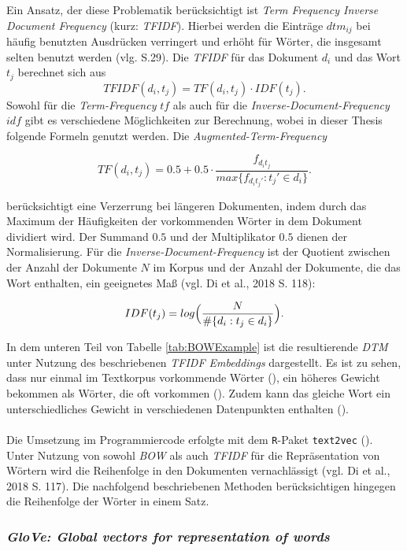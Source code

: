 \documentclass[a4paper,11pt]{article}
\begin{document}
Ein Ansatz, der diese Problematik berücksichtigt ist \textit{Term Frequency Inverse Document Frequency} (kurz: \textit{TFIDF}). Hierbei werden die Einträge $dtm_{ij}$ bei häufig benutzten Ausdrücken verringert und erhöht für Wörter, die insgesamt selten benutzt werden (vlg. \cite{textMiningR} S.29). Die \textit{TFIDF} für das Dokument $d_i$ und das Wort $t_j$ berechnet sich aus 
\[TFIDF(d_i, t_j) = TF(d_i,t_j) \cdot IDF(t_j) . \]
Sowohl für die \textit{Term-Frequency} $tf$ als auch für die \textit{Inverse-Document-Frequency} $idf$ gibt es verschiedene Möglichkeiten zur Berechnung, wobei in dieser Thesis folgende Formeln genutzt werden.
Die \textit{Augmented-Term-Frequency}

\[TF(d_i,t_j) = 0.5 +  0.5 \cdot \frac{f_{d_i t_j}}{max \{ f_{d_i t_j'}: t_j' \in d_i \}} .\]

berücksichtigt eine Verzerrung bei längeren Dokumenten, indem durch das Maximum der Häufigkeiten der vorkommenden Wörter in dem Dokument dividiert wird. Der Summand $0.5$ und der Multiplikator $0.5$ dienen der Normalisierung. Für die \textit{Inverse-Document-Frequency} ist der Quotient zwischen der Anzahl der Dokumente $N$ im Korpus und der Anzahl der Dokumente, die das Wort enthalten, ein geeignetes Maß (vgl. Di et al., 2018 S. 118):

\[IDF(t_j) = log \Bigl( \frac{N}{\# \{d_i: t_j \in d_i \}} \Bigr) .\]

In dem unteren Teil von Tabelle \ref{tab:BOWExample} ist die resultierende \textit{DTM} unter Nutzung des beschriebenen \textit{TFIDF Embeddings} dargestellt. Es ist zu sehen, dass nur einmal im Textkorpus vorkommende Wörter (), ein höheres Gewicht bekommen als Wörter, die oft vorkommen (). Zudem kann das gleiche Wort ein unterschiedliches Gewicht in verschiedenen Datenpunkten enthalten ().\\
\\
Die Umsetzung im Programmiercode erfolgte mit dem \texttt{R}-Paket \texttt{text2vec} (\cite{text2vec}). 
Unter Nutzung von sowohl \textit{BOW} als auch \textit{TFIDF} für die Repräsentation von Wörtern wird die Reihenfolge in den Dokumenten vernachlässigt (vgl. Di et al., 2018 S. 117). 
Die nachfolgend beschriebenen Methoden berücksichtigen hingegen die Reihenfolge der Wörter in einem Satz.


\subsubsection{\textit{GloVe: Global vectors for representation of words}} \label{Kap:Glove}
\end{document}
